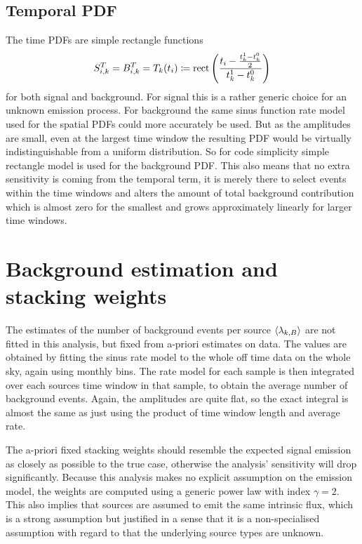 \subsection*{Temporal PDF}
The time PDFs are simple rectangle functions
\begin{equation}
  S_{i,k}^T = B_{i,k}^T = T_k(t_i) \coloneqq
    \operatorname{rect}\left(\frac{t_i - \frac{t_k^1-t_k^0}{2}}
                              {t_k^1-t_k^0}\right)
\end{equation}
for both signal and background.
For signal this is a rather generic choice for an unknown emission process.
For background the same sinus function rate model used for the spatial PDFs could more accurately be used.
But as the amplitudes are small, even at the largest time window the resulting PDF would be virtually indistinguishable from a uniform distribution.
So for code simplicity simple rectangle model is used for the background PDF.
This also means that no extra sensitivity is coming from the temporal term, it is merely there to select events within the time windows and alters the amount of total background contribution which is almost zero for the smallest and grows approximately linearly for larger time windows.


\section{Background estimation and stacking weights}
The estimates of the number of background events per source $\Braket{\lambda_{k,B}}$ are not fitted in this analysis, but fixed from a-priori estimates on data.
The values are obtained by fitting the sinus rate model to the whole off time data on the whole sky, again using monthly bins.
The rate model for each sample is then integrated over each sources time window in that sample, to obtain the average number of background events.
Again, the amplitudes are quite flat, so the exact integral is almost the same as just using the product of time window length and average rate.

The a-priori fixed stacking weights should resemble the expected signal emission as closely as possible to the true case, otherwise the analysis' sensitivity will drop significantly.
Because this analysis makes no explicit assumption on the emission model, the weights are computed using a generic power law with index $\gamma=2$.
This also implies that sources are assumed to emit the same intrinsic flux, which is a strong assumption but justified in a sense that it is a non-specialised assumption with regard to that the underlying source types are unknown.

